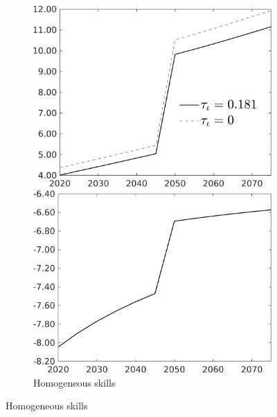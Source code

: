 \begin{figure}[h!!]
	\begin{subfigure}{0.7\textwidth}
		\caption{Homogeneous skills}
		\begin{minipage}[]{0.45\textwidth}
			\includegraphics[width=1\textwidth]{../../codding_model/own_basedOnFried/optimalPol_010922_revision/figures/all_13Sept22/CompTauf_bytaul_Reg0_tauf_spillover0_nsk1_xgr0_knspil0_sep0_LFlimit1_emsbase0_countec0_GovRev0_etaa0.79_lgd1.png}
		\end{minipage}	
		\begin{minipage}[]{0.45\textwidth}
			\includegraphics[width=1\textwidth]{../../codding_model/own_basedOnFried/optimalPol_010922_revision/figures/all_13Sept22/CompTaufPER_bytaul_Reg0_tauf_spillover0_nsk1_xgr0_knspil0_sep0_LFlimit1_emsbase0_countec0_GovRev0_etaa0.79_lgd0.png} 
		\end{minipage}	
	\end{subfigure}		
	

\end{figure}
